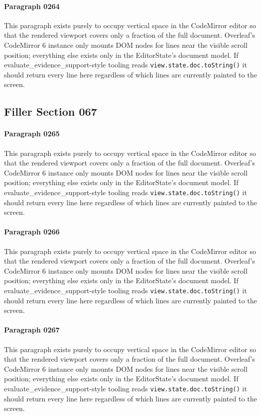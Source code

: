 \documentclass{article}
\begin{document}
\paragraph{Paragraph 0264}
This paragraph exists purely to occupy vertical space in the CodeMirror editor so that the rendered viewport covers only a fraction of the full document. Overleaf's CodeMirror 6 instance only mounts DOM nodes for lines near the visible scroll position; everything else exists only in the EditorState's document model. If evaluate\_evidence\_support-style tooling reads \texttt{view.state.doc.toString()} it should return every line here regardless of which lines are currently painted to the screen.

\subsection{Filler Section 067}
\paragraph{Paragraph 0265}
This paragraph exists purely to occupy vertical space in the CodeMirror editor so that the rendered viewport covers only a fraction of the full document. Overleaf's CodeMirror 6 instance only mounts DOM nodes for lines near the visible scroll position; everything else exists only in the EditorState's document model. If evaluate\_evidence\_support-style tooling reads \texttt{view.state.doc.toString()} it should return every line here regardless of which lines are currently painted to the screen.

\paragraph{Paragraph 0266}
This paragraph exists purely to occupy vertical space in the CodeMirror editor so that the rendered viewport covers only a fraction of the full document. Overleaf's CodeMirror 6 instance only mounts DOM nodes for lines near the visible scroll position; everything else exists only in the EditorState's document model. If evaluate\_evidence\_support-style tooling reads \texttt{view.state.doc.toString()} it should return every line here regardless of which lines are currently painted to the screen.

\paragraph{Paragraph 0267}
This paragraph exists purely to occupy vertical space in the CodeMirror editor so that the rendered viewport covers only a fraction of the full document. Overleaf's CodeMirror 6 instance only mounts DOM nodes for lines near the visible scroll position; everything else exists only in the EditorState's document model. If evaluate\_evidence\_support-style tooling reads \texttt{view.state.doc.toString()} it should return every line here regardless of which lines are currently painted to the screen.
\end{document}
